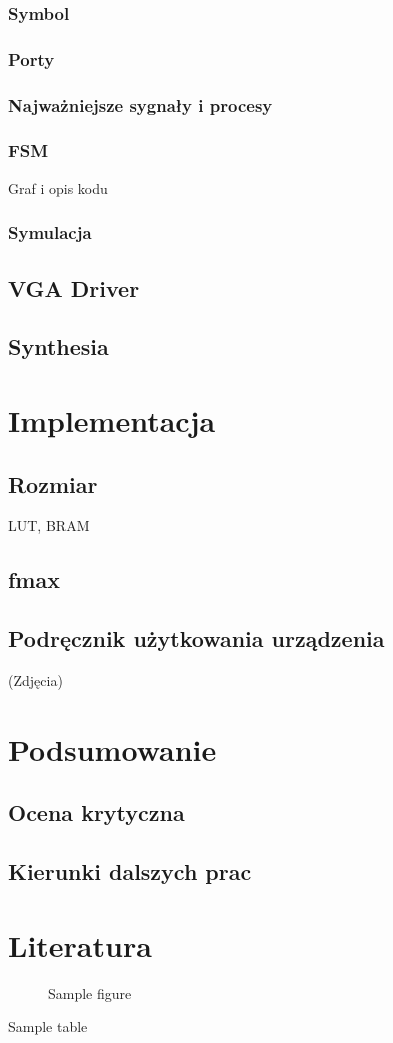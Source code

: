 \documentclass[a4paper]{report}
\begin{document}
		\subsection{Symbol}
		\subsection{Porty}
		\subsection{Najważniejsze sygnały i procesy}
		\subsection{FSM}
		Graf i opis kodu
		\subsection{Symulacja}
	\section{VGA Driver}
	\section{Synthesia}
	
\chapter{Implementacja}
	\section{Rozmiar}
	LUT, BRAM
	\section{fmax}
	\section{Podręcznik użytkowania urządzenia}
	(Zdjęcia)
	
\chapter{Podsumowanie}
	\section{Ocena krytyczna}	
	\section{Kierunki dalszych prac}
	
\chapter{Literatura}

\begin{figure}
	\caption{Sample figure}
\end{figure}
		
\begin{table}
	\caption{Sample table}
\end{table}

\begin{appendix}
	\listoffigures
	\listoftables
\end{appendix}
\end{document}
